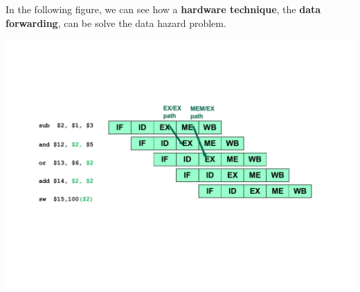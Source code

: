 \begin{examplebox}\label{example: data forwarding}
    In the following figure, we can see how a \textbf{hardware technique}, the \textbf{data forwarding}, can be solve the data hazard problem.
    \begin{center}
        \includegraphics[width=\textwidth]{img/data-forwarding-1.pdf}
    \end{center}
\end{examplebox}
